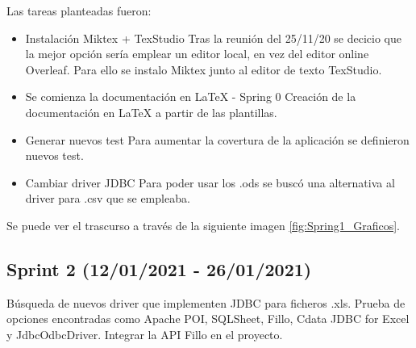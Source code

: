 Las tareas planteadas fueron:
\begin{itemize}
	\tightlist
	\item Instalación Miktex + TexStudio
		Tras la reunión del 25/11/20 se decicio que la mejor opción sería emplear un editor local, en vez del editor online Overleaf. Para ello se instalo Miktex junto al editor de texto TexStudio.
	\item Se comienza la documentación en LaTeX  - Spring 0
		Creación de la documentación en LaTeX a partir de las plantillas.
	\item Generar nuevos test
		Para aumentar la covertura de la aplicación se definieron nuevos test.
	\item Cambiar driver JDBC 
		Para poder usar los .ods se buscó una alternativa al driver para .csv que se empleaba.
\end{itemize}

Se puede ver el trascurso a través de la siguiente imagen \ref{fig:Spring1_Graficos}.


\subsection{Sprint 2 (12/01/2021 - 26/01/2021)}
Búsqueda de nuevos driver que implementen JDBC para ficheros .xls. Prueba de opciones encontradas como Apache POI, SQLSheet, Fillo, Cdata JDBC for Excel y JdbcOdbcDriver. Integrar la API Fillo en el proyecto. 

